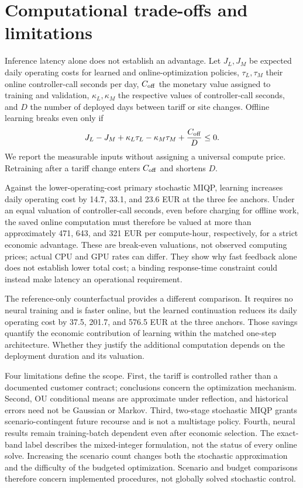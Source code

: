 \documentclass[preprint,11pt]{elsarticle}
\theoremstyle{plain}
\theoremstyle{remark}
\begin{document}
\section{Computational trade-offs and limitations}\label{sec:compute-economics}

Inference latency alone does not establish an advantage. Let $J_L,J_M$ be
expected daily operating costs for learned and online-optimization policies,
$\tau_L,\tau_M$ their online controller-call seconds per day, $C_{\rm off}$
the monetary value assigned to training and validation, $\kappa_L,\kappa_M$
the respective values of controller-call seconds, and $D$ the number of deployed days between tariff or
site changes. Offline learning breaks even only if
\begin{equation}
 J_L-J_M+\kappa_L\tau_L-\kappa_M\tau_M+\frac{C_{\rm off}}{D}\leq0.
 \label{eq:amortization}
\end{equation}
We report the measurable inputs without assigning a universal compute price.
Retraining after a
tariff change enters $C_{\rm off}$ and shortens $D$.

Against the lower-operating-cost primary stochastic MIQP, learning increases
daily operating cost by 14.7, 33.1, and 23.6 EUR at the three fee anchors.
Under an equal valuation of controller-call seconds, even before charging
for offline work, the saved online computation must
therefore be valued at more than approximately 471, 643, and 321 EUR per
compute-hour, respectively, for a strict economic advantage. These are
break-even valuations, not observed computing prices; actual CPU and GPU
rates can differ. They show why fast
feedback alone does not establish lower total cost; a binding response-time
constraint could instead make latency an operational requirement.

The reference-only counterfactual provides a different comparison. It requires
no neural training and is faster online, but the learned continuation reduces
its daily operating cost by 37.5, 201.7, and 576.5 EUR at the three anchors.
Those savings quantify the economic contribution of learning within the
matched one-step architecture. Whether they justify the additional computation
depends on the deployment duration and its valuation.

Four limitations define the scope. First, the tariff is controlled rather than
a documented customer contract; conclusions concern the optimization
mechanism. Second, OU conditional means are approximate under reflection, and
historical errors need not be Gaussian or Markov. Third, two-stage stochastic
MIQP grants scenario-contingent future recourse and is not a multistage policy.
Fourth, neural results remain training-batch dependent even after economic
selection. The exact-band label describes
the mixed-integer formulation, not the status of every online solve. Increasing
the scenario count changes both the stochastic approximation and the difficulty
of the budgeted optimization. Scenario and budget comparisons therefore
concern implemented procedures, not globally solved stochastic control.
\end{document}
